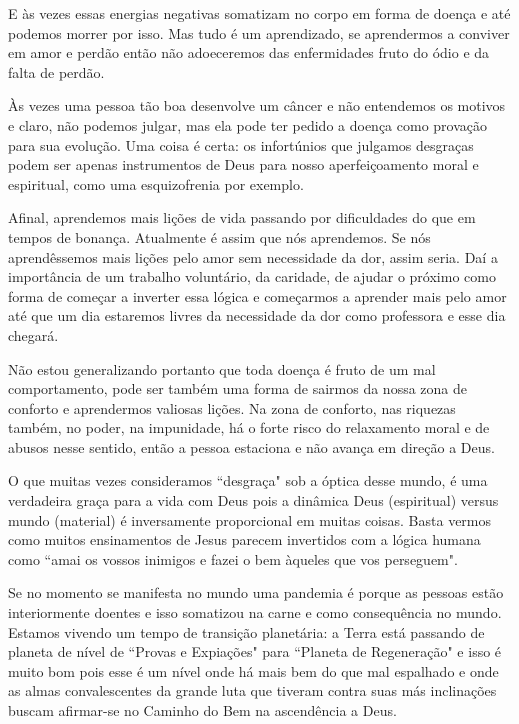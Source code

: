 \emdash{}E às vezes essas energias negativas somatizam no corpo em forma de doença e até podemos morrer por isso. Mas tudo é um aprendizado, se aprendermos a conviver em amor e perdão então não adoeceremos das enfermidades fruto do ódio e da falta de perdão.

\emdash{}Às vezes uma pessoa tão boa desenvolve um câncer e não entendemos os motivos e claro, não podemos julgar, mas ela pode ter pedido a doença como provação para sua evolução. Uma coisa é certa: os infortúnios que julgamos desgraças podem ser apenas instrumentos de Deus para nosso aperfeiçoamento moral e espiritual, como uma esquizofrenia por exemplo. 

\emdash{}Afinal, aprendemos mais lições de vida passando por dificuldades do que em tempos de bonança. Atualmente é assim que nós aprendemos. Se nós aprendêssemos mais lições pelo amor sem necessidade da dor, assim seria. Daí a importância de um trabalho voluntário, da caridade, de ajudar o próximo como forma de começar a inverter essa lógica e começarmos a aprender mais pelo amor até que um dia estaremos livres da necessidade da dor como professora e esse dia chegará.

\emdash{}Não estou generalizando portanto que toda doença é fruto de um mal comportamento, pode ser também uma forma de sairmos da nossa zona de conforto e aprendermos valiosas lições. Na zona de conforto, nas riquezas também, no poder, na impunidade, há o forte risco do relaxamento moral e de abusos nesse sentido, então a pessoa estaciona e não avança em direção a Deus.

\emdash{}O que muitas vezes consideramos ``desgraça" sob a óptica desse mundo, é uma verdadeira graça para a vida com Deus pois a dinâmica Deus (espiritual) versus mundo (material) é inversamente proporcional em muitas coisas. Basta vermos como muitos ensinamentos de Jesus parecem invertidos com a lógica humana como ``amai os vossos inimigos e fazei o bem àqueles que vos perseguem".

\emdash{}Se no momento se manifesta no mundo uma pandemia é porque as pessoas estão interiormente doentes e isso somatizou na carne e como consequência no mundo. Estamos vivendo um tempo de transição planetária: a Terra está passando de planeta de nível de ``Provas e Expiações" para ``Planeta de Regeneração" e isso é muito bom pois esse é um nível onde há mais bem do que mal espalhado e onde as almas convalescentes da grande luta que tiveram contra suas más inclinações buscam afirmar-se no Caminho do Bem na ascendência a Deus. 